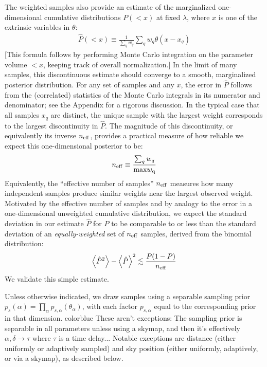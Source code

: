 The weighted samples also provide an estimate of the marginalized one-dimensional cumulative distributions $P(<x)$ at
fixed $\lambda$, where $x$ is one of the extrinsic variables in $\theta$:
\begin{eqnarray}
\hat{P}(<x) \equiv \frac{1}{\sum_q w_q} \sum_q w_q \theta(x-x_q)
\end{eqnarray}
[This formula follows by performing Monte Carlo integration on the parameter volume $<x$, keeping track of overall
  normalization.]  
In the limit of many samples, this discontinuous estimate should converge to a smooth, marginalized posterior
  distribution.  
%
For any set of samples and any $x$, the error in $\hat{P}$ follows from the (correlated) statistics of the Monte Carlo
integrals in its numerator and denominator; see the Appendix for a rigorous discussion. 
In the typical case that all samples $x_q$ are distinct, the unique sample with the largest weight corresponds to the
largest discontinuity in $\hat{P}$.  The magnitude of this discontinuity, or equivalently its inverse $n_{\rm eff}$,
provides a practical measure of how reliable we expect this one-dimensional posterior to be:
\begin{eqnarray}
n_{\rm eff} \equiv \frac{\sum_q w_q}{\text{max} w_{\rm q}}
\end{eqnarray}
Equivalently, the ``effective number of samples'' $n_{\rm eff}$ measures how many independent samples produce similar
weights near the largest observed weight.  
%
Motivated by the effective number of samples and by analogy to the error in a one-dimensional unweighted cumulative
distribution, we expect the standard deviation in our estimate $\hat{P}$ for $P$ to be comparable to or less than the
standard deviation of an \emph{equally-weighted} set of $n_{\rm eff}$ samples,  derived from the binomial distribution:
\begin{eqnarray}
\left<\hat{P}^2\right > - \left<\hat{P} \right>^2 \lesssim \frac{P(1-P)}{n_{\rm eff}}
\end{eqnarray}
We  validate this simple estimate.  


%
Unless otherwise indicated, we draw samples using a separable sampling prior $p_s(\alpha) =
\prod_{\alpha}p_{s,\alpha}(\theta_\alpha)$, with each factor $p_{s,\alpha}$ equal to the corresponding prior in that dimension. {color{blue} These aren't exceptions: The sampling prior is separable in all parameters unless using a skymap, and then it's effectively $\alpha,\delta\rightarrow\tau$ where $\tau$ is a time delay... Notable exceptions are
distance (either uniformly or adaptively sampled) and sky position (either uniformly, adaptively, or via a skymap), as
described below.}
%

